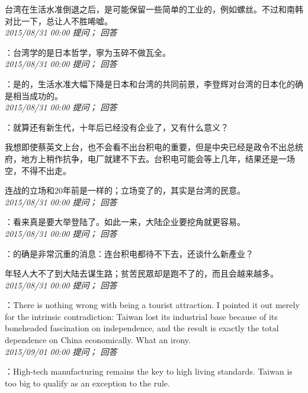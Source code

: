 \documentclass[twocolumn]{ctexart}
\begin{document}
台湾在生活水准倒退之后，是可能保留一些简单的工业的，例如螺丝。不过和南韩对比一下，总让人不胜唏嘘。\\

\textit{\hfill\noindent\small 2015/08/31 00:00 提问； 回答}

：台湾学的是日本哲学，寧为玉碎不做瓦全。\\

\textit{\hfill\noindent\small 2015/08/31 00:00 提问； 回答}

：是的，生活水准大幅下降是日本和台湾的共同前景，李登辉对台湾的日本化的确是相当成功的。\\

\textit{\hfill\noindent\small 2015/08/31 00:00 提问； 回答}

：就算还有新生代，十年后已经没有企业了，又有什么意义？

我想即使蔡英文上台，也不会看不出台积电的重要，但是中央已经是政令不出总统府，地方上稍作抗争，电厂就建不下去。台积电可能会等上几年，结果还是一场空，不得不出走。

连战的立场和20年前是一样的；立场变了的，其实是台湾的民意。\\

\textit{\hfill\noindent\small 2015/08/31 00:00 提问； 回答}

：看来真是要大举登陆了。如此一来，大陆企业要挖角就更容易。\\

\textit{\hfill\noindent\small 2015/08/31 00:00 提问； 回答}

：的确是非常沉重的消息：连台积电都待不下去，还谈什么新產业？

年轻人大不了到大陆去谋生路；贫苦民眾却是跑不了的，而且会越来越多。\\

\textit{\hfill\noindent\small 2015/08/31 00:00 提问； 回答}

：There is nothing wrong with being a tourist attraction. I pointed it out merely for the intrinsic contradiction: Taiwan lost its industrial base because of its boneheaded fascination on independence, and the result is exactly the total dependence on China economically. What an irony.\\

\textit{\hfill\noindent\small 2015/09/01 00:00 提问； 回答}

：High-tech manufacturing remains the key to high living standards. Taiwan is too big to qualify as an exception to the rule.\\
\end{document}
